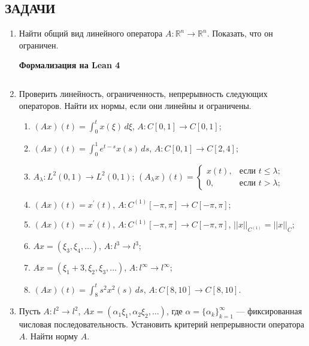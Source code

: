 \documentclass[12pt,a4paper]{article}
\begin{document}
\subsection*{ЗАДАЧИ}
\begin{enumerate}
\newpage
\item Найти общий вид линейного оператора $A: \mathbb{R}^{n} \rightarrow \mathbb{R}^{n}$. Показать, что он ограничен.


\begin{center}\small\textbf{Формализация на Lean 4}\end{center}
\inputminted{lean}{FunAn/Section14_LinearOperators/Task01.lean}

\newpage

\item Проверить линейность, ограниченность, непрерывность следующих операторов. Найти их нормы, если они линейны и ограничены.
\begin{enumerate}[label=\alph*)]
\item $(Ax)(t) = \int_{0}^{t} x(\xi) \, d\xi$, $A: C[0,1] \rightarrow C[0,1]$;
\item $(Ax)(t) = \int_{0}^{1} e^{t-s} x(s) \, ds$, $A: C[0,1] \rightarrow C[2,4]$;
\item $A_{\lambda}: L^{2}(0,1) \rightarrow L^{2}(0,1)$; $(A_{\lambda}x)(t) =
\begin{cases} x(t), & \text{если } t \le \lambda; \\ 0, & \text{если } t > \lambda;
\end{cases}$
\item $(Ax)(t) = x^{\prime}(t)$, $A: C^{(1)}[-\pi,\pi] \rightarrow C[-\pi,\pi]$;
\item $(Ax)(t) = x^{\prime}(t)$, $A: C^{(1)}[-\pi,\pi] \rightarrow C[-\pi,\pi]$, $||x||_{C^{(1)}} = ||x||_{C}$;
\item $Ax = (\xi_{3}, \xi_{4}, \dots)$, $A: l^{3} \rightarrow l^{3}$;
\item $Ax = (\xi_{1}+3, \xi_{2}, \xi_{3}, \dots)$, $A: l^{\infty} \rightarrow l^{\infty}$;
\item $(Ax)(t) = \int_{8}^{t} s^{2} x^{2}(s) \, ds$, $A: C[8,10] \rightarrow C[8,10]$.
\end{enumerate}

\item Пусть $A: l^{2} \rightarrow l^{2}$, $Ax = (\alpha_{1}\xi_{1}, \alpha_{2}\xi_{2}, \dots)$, где $\alpha = \{\alpha_{k}\}_{k=1}^{\infty}$ — фиксированная числовая последовательность. Установить критерий непрерывности оператора $A$. Найти норму $A$.


\end{enumerate}
\end{document}
